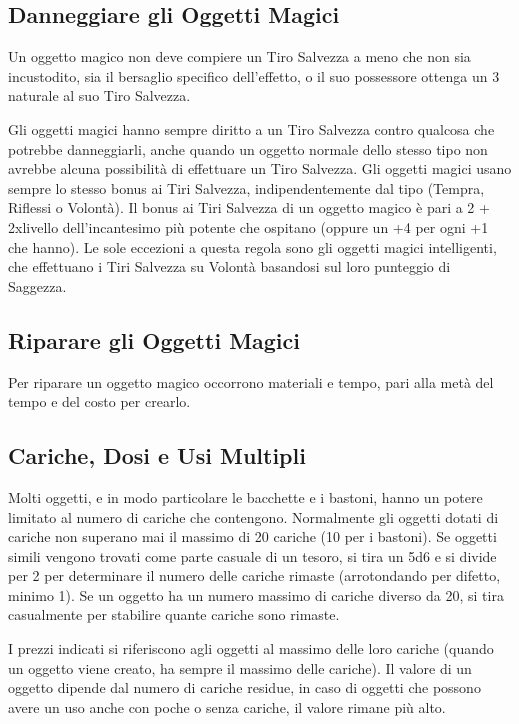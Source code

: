 \begin{multicols}{2}
	\subsection{Danneggiare gli Oggetti Magici}

	\label{danneggiare-gli-oggetti-magici}

	Un oggetto magico non deve compiere un Tiro Salvezza a meno che non sia incustodito, sia il bersaglio specifico dell'effetto, o il suo possessore ottenga un 3 naturale al suo Tiro Salvezza.

	Gli oggetti magici hanno sempre diritto a un Tiro Salvezza contro qualcosa che potrebbe danneggiarli, anche quando un oggetto normale dello stesso tipo non avrebbe alcuna possibilità di effettuare un Tiro Salvezza. Gli oggetti magici usano sempre lo stesso bonus ai Tiri Salvezza, indipendentemente dal tipo (Tempra, Riflessi o Volontà). Il bonus ai Tiri Salvezza di un oggetto magico è pari a 2 + 2xlivello dell'incantesimo più potente che ospitano (oppure un +4 per ogni +1 che hanno). Le sole eccezioni a questa regola sono gli oggetti magici intelligenti, che effettuano i Tiri Salvezza su Volontà basandosi sul loro punteggio di Saggezza.

	\subsection{Riparare gli Oggetti Magici}
	\label{riparare-gli-oggetti-magici}

	Per riparare un oggetto magico occorrono materiali e tempo, pari alla metà del tempo e del costo per crearlo.

	\subsection{Cariche, Dosi e Usi Multipli}

	\label{cariche-dosi-e-usi-multipli}

	Molti oggetti, e in modo particolare le bacchette e i bastoni, hanno un potere limitato al numero di cariche che contengono. Normalmente gli oggetti dotati di cariche non superano mai il massimo di 20 cariche (10 per i bastoni). Se oggetti simili vengono trovati come parte casuale di un tesoro, si tira un 5d6 e si divide per 2 per determinare il numero delle cariche rimaste (arrotondando per difetto, minimo 1). Se un oggetto ha un numero massimo di cariche diverso da 20, si tira casualmente per stabilire quante cariche sono rimaste.

	I prezzi indicati si riferiscono agli oggetti al massimo delle loro cariche (quando un oggetto viene creato, ha sempre il massimo delle cariche). Il valore di un oggetto dipende dal numero di cariche residue, in caso di oggetti che possono avere un uso anche con poche o senza cariche, il valore rimane più alto.

\end{multicols}

